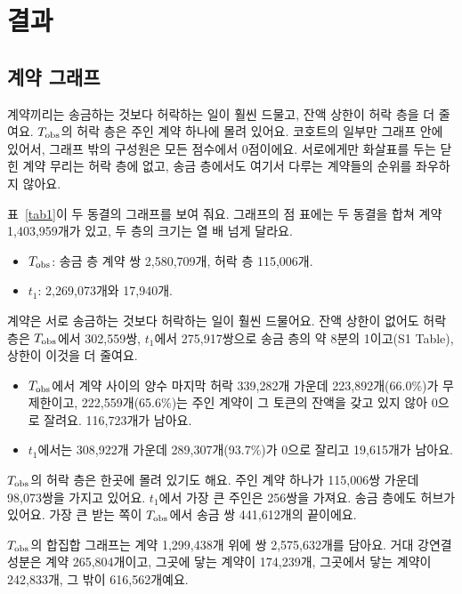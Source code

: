 \section{결과}

\subsection{계약 그래프}

\begin{yoji}
계약끼리는 송금하는 것보다 허락하는 일이 훨씬 드물고, 잔액 상한이 허락 층을 더 줄여요. $T_{\mathrm{obs}}$의 허락 층은 주인 계약 하나에 몰려 있어요. 코호트의 일부만 그래프 안에 있어서, 그래프 밖의 구성원은 모든 점수에서 0점이에요. 서로에게만 화살표를 두는 닫힌 계약 무리는 허락 층에 없고, 송금 층에서도 여기서 다루는 계약들의 순위를 좌우하지 않아요.
\end{yoji}

표~\ref{tab1}이 두 동결의 그래프를 보여 줘요. 그래프의 점 표에는 두 동결을 합쳐 계약 1,403,959개가 있고, 두 층의 크기는 열 배 넘게 달라요.
\begin{itemize}
\item $T_{\mathrm{obs}}$: 송금 층 계약 쌍 2,580,709개, 허락 층 115,006개.
\item $t_1$: 2,269,073개와 17,940개.
\end{itemize}
계약은 서로 송금하는 것보다 허락하는 일이 훨씬 드물어요. 잔액 상한이 없어도 허락 층은 $T_{\mathrm{obs}}$에서 302,559쌍, $t_1$에서 275,917쌍으로 송금 층의 약 8분의 1이고(S1 Table), 상한이 이것을 더 줄여요.
\begin{itemize}
\item $T_{\mathrm{obs}}$에서 계약 사이의 양수 마지막 허락 339,282개 가운데 223,892개(66.0\%)가 무제한이고, 222,559개(65.6\%)는 주인 계약이 그 토큰의 잔액을 갖고 있지 않아 0으로 잘려요. 116,723개가 남아요.
\item $t_1$에서는 308,922개 가운데 289,307개(93.7\%)가 0으로 잘리고 19,615개가 남아요.
\end{itemize}
$T_{\mathrm{obs}}$의 허락 층은 한곳에 몰려 있기도 해요. 주인 계약 하나가 115,006쌍 가운데 98,073쌍을 가지고 있어요. $t_1$에서 가장 큰 주인은 256쌍을 가져요. 송금 층에도 허브가 있어요. 가장 큰 받는 쪽이 $T_{\mathrm{obs}}$에서 송금 쌍 441,612개의 끝이에요.

$T_{\mathrm{obs}}$의 합집합 그래프는 계약 1,299,438개 위에 쌍 2,575,632개를 담아요. 거대 강연결 성분은 계약 265,804개이고, 그곳에 닿는 계약이 174,239개, 그곳에서 닿는 계약이 242,833개, 그 밖이 616,562개예요.

